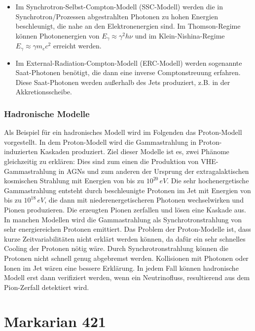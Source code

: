 \begin{itemize}
\item Im Synchrotron-Selbst-Compton-Modell (SSC-Modell) werden die in Synchrotron\-/Prozessen abgestrahlten Photonen zu hohen Energien beschleunigt, die nahe an den Elektronenergien sind.
Im Thomson-Regime können Photonenergien von $E_{\gamma}\approx \gamma^2 h \nu$ und im Klein-Nishina-Regime $E_{\gamma}\approx \gamma m_e c^2$ erreicht werden.\cite{Weekes}
\item Im External-Radiation-Compton-Modell (ERC-Modell) werden sogenannte Saat-Photonen benötigt, die dann eine inverse Comptonstreuung erfahren.
Diese Saat-Photonen werden außerhalb des Jets produziert, z.B. in der Akkretionsscheibe.\cite{Weekes}
\end{itemize}

\subsubsection{Hadronische Modelle}
Als Beispiel für ein hadronisches Modell wird im Folgenden das Proton-Modell vorgestellt.
In dem Proton-Modell wird die Gammastrahlung in Proton-induzierten Kaskaden produziert. 
Ziel dieser Modelle ist es, zwei Phänome gleichzeitig zu erklären: 
Dies sind zum einen die Produktion von VHE-Gammastrahlung in AGNs und zum anderen der Ursprung der extragalaktischen kosmischen Strahlung mit Energien von bis zu $10^{20}\,\si{eV}$.
Die sehr hochenergetische Gammastrahlung entsteht durch beschleunigte Protonen im Jet mit Energien von bis zu $10^{18}\,\si{eV}$, die dann mit niederenergetischeren Photonen wechselwirken und Pionen produzieren.
Die erzeugten Pionen zerfallen und lösen eine Kaskade aus.
In manchen Modellen wird die Gammastrahlung als Synchrotronstrahlung von sehr energiereichen Protonen emittiert.
Das Problem der Proton-Modelle ist, dass kurze Zeitvariabilitäten nicht erklärt werden können, da dafür ein sehr schnelles Cooling der Protonen nötig wäre. 
Durch Synchrotronstrahlung können die Protonen nicht schnell genug abgebremst werden.
Kollisionen mit Photonen oder Ionen im Jet wären eine bessere Erklärung.
In jedem Fall können hadronische Modell erst dann verifiziert werden, wenn ein Neutrinofluss, resultierend aus dem Pion-Zerfall detektiert wird.\cite{Weekes}


\section{Markarian 421}
\label{sec:Mrk421}

